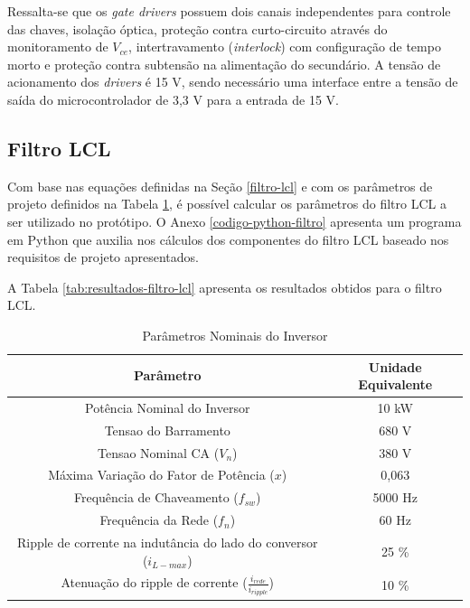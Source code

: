 Ressalta-se que os \textit{gate drivers} possuem dois canais independentes para controle das chaves, isolação óptica, proteção contra curto-circuito através do monitoramento de $V_{ce}$, intertravamento (\textit{interlock}) com configuração de tempo morto e proteção contra subtensão na alimentação do secundário.
A tensão de acionamento dos \textit{drivers} é 15 V, sendo necessário uma interface entre a tensão de saída do microcontrolador de 3,3 V para a entrada de 15 V.

\subsection{Filtro LCL}

Com base nas equações definidas na Seção \ref{filtro-lcl} e com os parâmetros de projeto definidos na Tabela \ref{tab:parametros-inversor}, é possível calcular os parâmetros do filtro LCL a ser utilizado no protótipo.
O Anexo \ref{codigo-python-filtro} apresenta um programa em Python que auxilia nos cálculos dos componentes do filtro LCL baseado nos requisitos de projeto apresentados.

A Tabela \ref{tab:resultados-filtro-lcl} apresenta os resultados obtidos para o filtro LCL.

\begin{table}[h]
	\centering
	\caption{Parâmetros Nominais do Inversor}
	\label{tab:parametros-inversor}

	\begin{tabular}{cc}
		\toprule
		\textbf{Parâmetro} & \textbf{Unidade Equivalente} \\
		\midrule
		Potência Nominal do Inversor & 10 kW \\
		Tensao do Barramento & 680 V \\
		Tensao Nominal CA ($V_n$) & 380 V \\
		Máxima Variação do Fator de Potência ($x$) & 0,063 \\
		Frequência de Chaveamento ($f_{sw}$) & 5000 Hz \\
		Frequência da Rede ($f_n$) & 60 Hz \\
		Ripple de corrente na indutância do lado do conversor ($i_{L-max}$) &  25 \% \\
		Atenuação do ripple de corrente ($\frac{i_{rede}}{i_{ripple}}$) & 10 \% \\
		\bottomrule
	\end{tabular}
\end{table}

